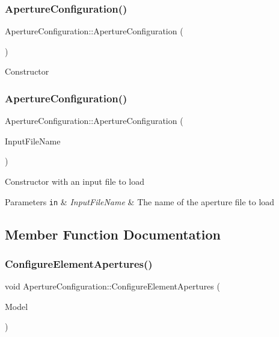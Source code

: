 \subsubsection{\texorpdfstring{Aperture\+Configuration()}{ApertureConfiguration()}\hspace{0.1cm}{\footnotesize\ttfamily [1/2]}}
{\footnotesize\ttfamily Aperture\+Configuration\+::\+Aperture\+Configuration (\begin{DoxyParamCaption}{ }\end{DoxyParamCaption})}

Constructor \mbox{\label{classApertureConfiguration_affd6ff3a6500fb8b7aecc5d8cc7d5ab5}} 
\subsubsection{\texorpdfstring{Aperture\+Configuration()}{ApertureConfiguration()}\hspace{0.1cm}{\footnotesize\ttfamily [2/2]}}
{\footnotesize\ttfamily Aperture\+Configuration\+::\+Aperture\+Configuration (\begin{DoxyParamCaption}\item[{std\+::string}]{Input\+File\+Name }\end{DoxyParamCaption})}

Constructor with an input file to load 
\begin{DoxyParams}[1]{Parameters}
\mbox{\tt in}  & {\em Input\+File\+Name} & The name of the aperture file to load \\
\hline
\end{DoxyParams}


\subsection{Member Function Documentation}
\mbox{\label{classApertureConfiguration_af954151209360897a506d914f922f03f}} 
\subsubsection{\texorpdfstring{Configure\+Element\+Apertures()}{ConfigureElementApertures()}}
{\footnotesize\ttfamily void Aperture\+Configuration\+::\+Configure\+Element\+Apertures (\begin{DoxyParamCaption}\item[{\hyperlink{classAcceleratorModel}{Accelerator\+Model} $\ast$}]{Model }\end{DoxyParamCaption})}

